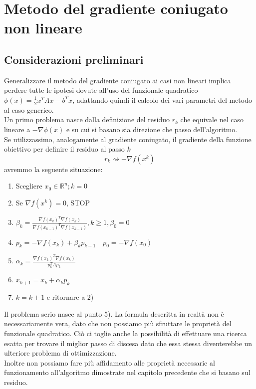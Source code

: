 \chapter{Metodo del gradiente coniugato non lineare}

\section{Considerazioni preliminari} Generalizzare il metodo del
gradiente coniugato ai casi non lineari implica perdere tutte le
ipotesi dovute all'uso del funzionale quadratico $\phi(x) =
\frac{1}{2} x^{T} A x - b^{T} x$, adattando quindi il calcolo dei vari
parametri del metodo al caso generico.\\

Un primo problema nasce dalla definizione del residuo $r_{k}$ che
equivale nel caso lineare a $-\nabla \phi(x)$ e su cui si basano sia
direzione che passo dell'algoritmo. \\

Se utilizzassimo, analogamente al gradiente coniugato, il gradiente
della funzione obiettivo per definire il residuo al passo $k$
 $$ r_{k}\rightsquigarrow -\nabla f(x^{k})$$
avremmo la seguente situazione:

\begin{enumerate}
 \item Scegliere $x_0 \in \mathbb{R}^{n}; k =0$
 \item Se $\nabla f(x^{k}) = 0$, STOP
 \item $\beta_{k} = \frac{\nabla f(x_{k})^{T} \nabla f(x_{k})} {\nabla
f(x_{k-1})^{T} \nabla f(x_{k-1})}, k \geq 1, \beta_{0} = 0$
 \item $p_{k} = -\nabla f(x_{k}) + \beta_{k} p_{k-1} \quad p_{0} =
-\nabla f(x_{0})$
 \item $\alpha_{k} = \frac{\nabla f(x_{k})^{T} \nabla f(x_{k})}{p_{k}^{T}Ap_{k}}$ \\
 \item $x_{k+1} = x_{k} +\alpha_{k} p_{k}$
 \item $k = k+1$ e ritornare a 2)
\end{enumerate} Il problema serio nasce al punto 5). La formula
descritta in realtà non \`e necessariamente vera, dato che non possiamo
più sfruttare le proprietà del funzionale quadratico. Ciò ci toglie
anche la possibilità di effettuare una ricerca esatta per trovare il
miglior passo di discesa dato che essa stessa diventerebbe un
ulteriore problema di ottimizzazione.\\ Inoltre non possiamo fare più
affidamento alle proprietà necessarie al funzionamento all'algoritmo
dimostrate nel capitolo precedente che si basano sul residuo. \\

